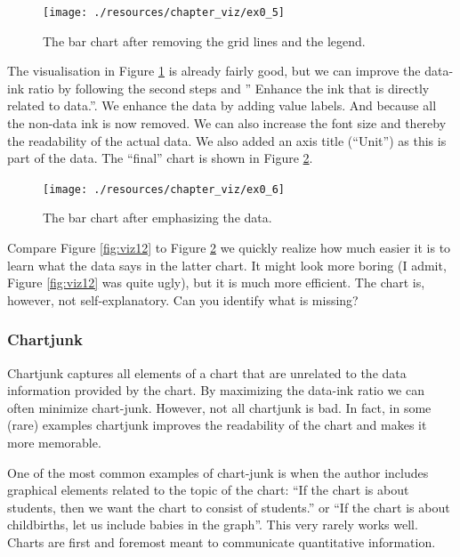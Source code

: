 \documentclass[
]{book}
\begin{document}
\begin{figure}

{\centering \texttt{[image: ./resources/chapter\_viz/ex0\_5]} 

}

\caption{The bar chart after removing the grid lines and the legend.}\label{fig:viz15}
\end{figure}

The visualisation in Figure \ref{fig:viz15} is already fairly good, but we can improve the data-ink ratio by following the second steps and '' Enhance the ink that is directly related to data.''. We enhance the data by adding value labels. And because all the non-data ink is now removed. We can also increase the font size and thereby the readability of the actual data. We also added an axis title (``Unit'') as this is part of the data. The ``final'' chart is shown in Figure \ref{fig:viz16}.

\begin{figure}

{\centering \texttt{[image: ./resources/chapter\_viz/ex0\_6]} 

}

\caption{The bar chart after emphasizing the data.}\label{fig:viz16}
\end{figure}

Compare Figure \ref{fig:viz12} to Figure \ref{fig:viz16} we quickly realize how much easier it is to learn what the data says in the latter chart. It might look more boring (I admit, Figure \ref{fig:viz12} was quite ugly), but it is much more efficient. The chart is, however, not self-explanatory. Can you identify what is missing?

\hypertarget{chartjunk}{%
\subsubsection*{Chartjunk}\label{chartjunk}}

Chartjunk captures all elements of a chart that are unrelated to the data information provided by the chart. By maximizing the data-ink ratio we can often minimize chart-junk. However, not all chartjunk is bad. In fact, in some (rare) examples chartjunk improves the readability of the chart and makes it more memorable.

One of the most common examples of chart-junk is when the author includes graphical elements related to the topic of the chart: ``If the chart is about students, then we want the chart to consist of students.'' or ``If the chart is about childbirths, let us include babies in the graph''. This very rarely works well. Charts are first and foremost meant to communicate quantitative information.
\end{document}
